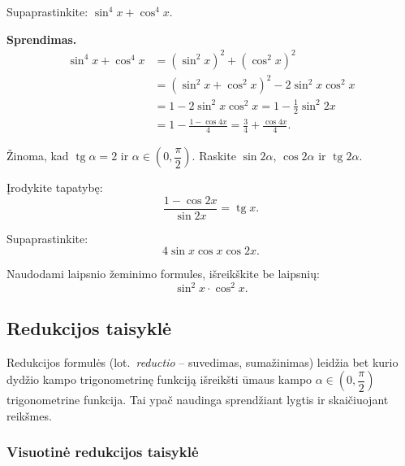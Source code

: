 \begin{example}
  Supaprastinkite: $\sin^4\!x + \cos^4\!x$.

  \textbf{Sprendimas.}
  \begin{align*}
    \sin^4\!x + \cos^4\!x
    &= (\sin^2\!x)^2 + (\cos^2\!x)^2 \\
    &= (\sin^2\!x + \cos^2\!x)^2 - 2\sin^2\!x\cos^2\!x \\
    &= 1 - 2\sin^2\!x\cos^2\!x
     = 1 - \tfrac{1}{2}\sin^2\!2x \\
    &= 1 - \frac{1-\cos 4x}{4}
     = \frac{3}{4} + \frac{\cos 4x}{4}.
  \end{align*}
\end{example}

\begin{exercise}
  Žinoma, kad $\operatorname{tg}\alpha = 2$ ir $\alpha \in \left(0,
  \dfrac{\pi}{2}\right)$. Raskite $\sin 2\alpha$, $\cos 2\alpha$ ir
  $\operatorname{tg} 2\alpha$.
\end{exercise}

\begin{exercise}
  Įrodykite tapatybę:
  \[
    \frac{1 - \cos 2x}{\sin 2x} = \operatorname{tg} x.
  \]
\end{exercise}

\begin{exercise}
  Supaprastinkite:
  \[
    4\sin x\cos x\cos 2x.
  \]
\end{exercise}

\begin{exercise}
  Naudodami laipsnio žeminimo formules, išreikškite be laipsnių:
  \[
    \sin^2 x \cdot \cos^2 x.
  \]
\end{exercise}

\subsection{Redukcijos taisyklė}

Redukcijos formulės (lot.\ \emph{reductio} -- suvedimas, sumažinimas)
leidžia bet kurio dydžio kampo trigonometrinę funkciją išreikšti ūmaus
kampo $\alpha \in \left(0, \dfrac{\pi}{2}\right)$ trigonometrine funkcija.
Tai ypač naudinga sprendžiant lygtis ir skaičiuojant reikšmes.

\subsubsection*{Visuotinė redukcijos taisyklė}

